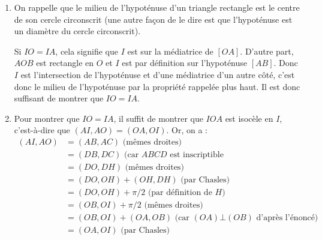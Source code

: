 \begin{exo}
\begin{sol}
\begin{enumerate}
\item On rappelle que le milieu de l'hypoténuse d'un triangle rectangle est le centre de son cercle circonscrit (une autre façon de le dire est que l'hypoténuse est un diamètre du cercle circonscrit).

Si $IO=IA$, cela signifie que $I$ est sur la médiatrice de $[OA]$. D'autre part, $AOB$ est rectangle en $O$ et $I$ est par définition sur l'hypoténuse $[AB]$. Donc $I$ est  l'intersection de l'hypoténuse et d'une médiatrice d'un autre côté, c'est donc le milieu de l'hypoténuse par la propriété rappelée plus haut. Il est donc suffisant de montrer que $IO=IA$.


\item Pour montrer que $IO=IA$, il suffit de montrer que $IOA$ est isocèle en $I$, c'est-à-dire que $(AI,AO)=(OA,OI)$. Or, on a :
\begin{align*}
(AI,AO)& = (AB,AC) \text{ (mêmes droites)}\\
&= (DB,DC) \text{ (car $ABCD$ est inscriptible}\\
&= (DO,DH) \text{ (mêmes droites)}\\
&= (DO,OH)+(OH,DH) \text{ (par Chasles)}\\
&= (DO,OH)+\pi/2 \text{ (par définition de $H$)}\\
&= (OB,OI)+\pi/2 \text{ (mêmes droites)}\\
&= (OB,OI) + (OA,OB) \text{ (car $(OA)\bot (OB)$ d'après l'énoncé)}\\
&= (OA,OI) \text{ (par Chasles)}
\end{align*}
\end{enumerate}

\end{sol}
\end{exo}


